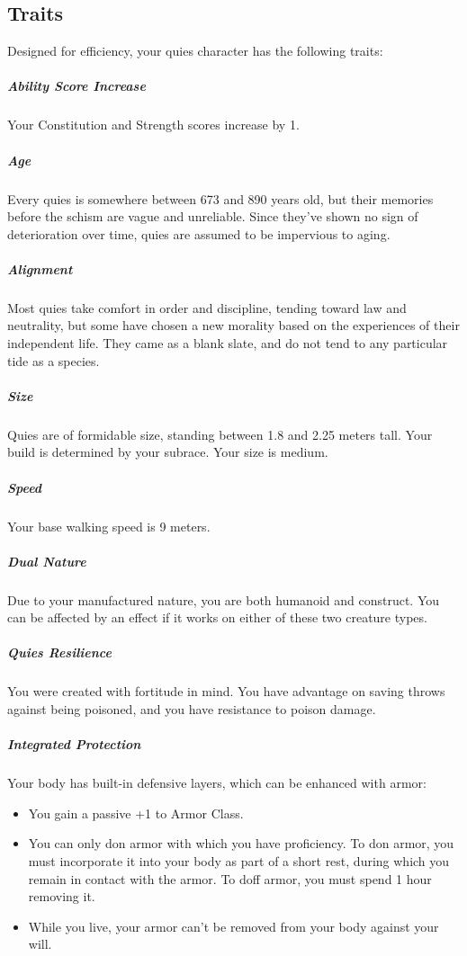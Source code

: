 \begin{linenumbers}
\subsection*{Traits}
Designed for efficiency, your quies character has the following traits:

\subparagraph{Ability Score Increase} Your Constitution and Strength scores increase by 1.

\subparagraph{Age} Every quies is somewhere between 673 and 890 years old, but their memories before the schism are vague and unreliable.
Since they've shown no sign of deterioration over time, quies are assumed to be impervious to aging.

\subparagraph{Alignment} Most quies take comfort in order and discipline, tending toward law and neutrality, but some have chosen a new morality based on the experiences of their independent life.
They came as a blank slate, and do not tend to any particular tide as a species.

\subparagraph{Size} Quies are of formidable size, standing between 1.8 and 2.25 meters tall.
Your build is determined by your subrace.
Your size is medium.

\subparagraph{Speed} Your base walking speed is 9 meters.

\subparagraph{Dual Nature} Due to your manufactured nature, you are both humanoid and construct.
You can be affected by an effect if it works on either of these two creature types.

\subparagraph{Quies Resilience} You were created with fortitude in mind.
You have advantage on saving throws against being poisoned, and you have resistance to poison damage.

\subparagraph{Integrated Protection} Your body has built-in defensive layers, which can be enhanced with armor:
\end{linenumbers}
\begin{itemize}
    \item You gain a passive +1 to Armor Class.
    \item You can only don armor with which you have proficiency.
    To don armor, you must incorporate it into your body as part of a short rest, during which you remain in contact with the armor.
    To doff armor, you must spend 1 hour removing it.
    \item While you live, your armor can't be removed from your body against your will.
\end{itemize}
